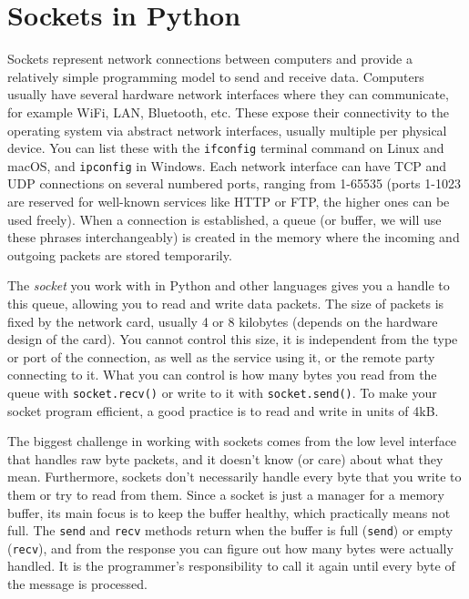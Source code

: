 \section*{Sockets in Python}

Sockets represent network connections between computers and provide a relatively simple programming model to send and receive data. Computers usually have several hardware network interfaces where they can communicate, for example WiFi, LAN, Bluetooth, etc. These expose their connectivity to the operating system via abstract network interfaces, usually multiple per physical device. You can list these with the \texttt{ifconfig} terminal command on Linux and macOS, and \texttt{ipconfig} in Windows. Each network interface can have TCP and UDP connections on several numbered ports, ranging from 1-65535 (ports 1-1023 are reserved for well-known services like HTTP or FTP, the higher ones can be used freely). When a connection is established, a queue (or buffer, we will use these phrases interchangeably) is created in the memory where the incoming and outgoing packets are stored temporarily. 

The \emph{socket} you work with in Python and other languages gives you a handle to this queue, allowing you to read and write data packets. The size of packets is fixed by the network card, usually 4 or 8 kilobytes (depends on the hardware design of the card). You cannot control this size, it is independent from the type or port of the connection, as well as the service using it, or the remote party connecting to it. What you can control is how many bytes you read from the queue with \texttt{socket.recv()} or write to it with \texttt{socket.send()}. To make your socket program efficient, a good practice is to read and write in units of 4kB.

The biggest challenge in working with sockets comes from the low level interface that handles raw byte packets, and it doesn’t know (or care) about what they mean. Furthermore, sockets don’t necessarily handle every byte that you write to them or try to read from them. Since a socket is just a manager for a memory buffer, its main focus is to keep the buffer healthy, which practically means not full. The \texttt{send} and \texttt{recv} methods return when the buffer is full (\texttt{send}) or empty (\texttt{recv}), and from the response you can figure out how many bytes were actually handled. It is the programmer’s responsibility to call it again until every byte of the message is processed.

